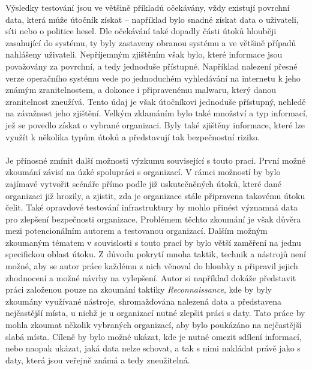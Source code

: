 Výsledky testování jsou ve většině příkladů očekávány, vždy existují povrchní data, která může útočník získat -- například bylo snadné získat data o uživateli, síti nebo o politice hesel.
Dle očekávání také dopadly části útoků hlouběji zasahující do systému, ty byly zastaveny obranou systému a ve většině případů nahlášeny uživateli.
Nepříjemným zjištěním však bylo, které informace jsou považovány za povrchní, a tedy jednoduše přístupné.
Například nalezení přesné verze operačního systému vede po jednoduchém vyhledávání na internetu k jeho známým zranitelnostem, a dokonce i připravenému malwaru, který danou zranitelnost zneužívá.
Tento údaj je však útočníkovi jednoduše přístupný, nehledě na závažnost jeho zjištění.
Velkým zklamáním bylo také množství a typ informací, jež se povedlo získat o vybrané organizaci.
Byly také zjištěny informace, které lze využít k několika typům útoků a představují tak bezpečnostní riziko.

\paragraph{}
Je přínosné zmínit další možnosti výzkumu související s touto prací.
První možné zkoumání závisí na úzké spolupráci s organizací.
V rámci možností by bylo zajímavé vytvořit scénáře přímo podle již uskutečněných útoků, které dané organizaci již hrozily, a zjistit, zda je organizace stále připravena takovému útoku čelit.
Také opravdové testování infrastruktury by mohlo přinést významná data pro zlepšení bezpečnosti organizace.
Problémem těchto zkoumání je však důvěra mezi potencionálním autorem a testovanou organizací.
Dalším možným zkoumaným tématem v souvislosti s touto prací by bylo větší zaměření na jednu specifickou oblast útoku.
Z důvodu pokrytí mnoha taktik, technik a nástrojů není možné, aby se autor práce každému z nich věnoval do hloubky a připravil jejich zhodnocení a možné návrhy na vylepšení.
Autor si například dokáže představit práci založenou pouze na zkoumání taktiky \textit{Reconnaissance}, kde by byly zkoumány využívané nástroje, shromažďována nalezená data a představena nejčastější místa, u nichž je u organizací nutné zlepšit práci s daty.
Tato práce by mohla zkoumat několik vybraných organizací, aby bylo poukázáno na nejčastější slabá místa.
Cíleně by bylo možné ukázat, kde je nutné omezit sdílení informací, nebo naopak ukázat, jaká data nelze schovat, a tak s nimi nakládat právě jako s daty, která jsou veřejně známá a tedy zneužitelná.












